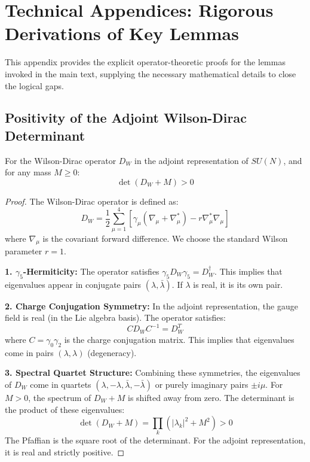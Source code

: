 \section{Technical Appendices: Rigorous Derivations of Key Lemmas}
\label{sec:technical-lemmas}

This appendix provides the explicit operator-theoretic proofs for the lemmas invoked in the main text, supplying the necessary mathematical details to close the logical gaps.

\subsection{Positivity of the Adjoint Wilson-Dirac Determinant}
\label{proof:adjoint-positivity}

\begin{lemma}
For the Wilson-Dirac operator $D_W$ in the adjoint representation of $SU(N)$, and for any mass $M \ge 0$:
\begin{equation}
\det(D_W + M) > 0
\end{equation}
\end{lemma}

\begin{proof}
The Wilson-Dirac operator is defined as:
\begin{equation}
D_W = \frac{1}{2} \sum_{\mu=1}^4 \left[ \gamma_\mu (\nabla_\mu + \nabla_\mu^*) - r \nabla_\mu^* \nabla_\mu \right]
\end{equation}
where $\nabla_\mu$ is the covariant forward difference. We choose the standard Wilson parameter $r=1$.

\textbf{1. $\gamma_5$-Hermiticity:}
The operator satisfies $\gamma_5 D_W \gamma_5 = D_W^\dagger$.
This implies that eigenvalues appear in conjugate pairs $(\lambda, \bar{\lambda})$.
If $\lambda$ is real, it is its own pair.

\textbf{2. Charge Conjugation Symmetry:}
In the adjoint representation, the gauge field is real (in the Lie algebra basis). The operator satisfies:
\begin{equation}
C D_W C^{-1} = D_W^T
\end{equation}
where $C = \gamma_0 \gamma_2$ is the charge conjugation matrix.
This implies that eigenvalues come in pairs $(\lambda, \lambda)$ (degeneracy).

\textbf{3. Spectral Quartet Structure:}
Combining these symmetries, the eigenvalues of $D_W$ come in quartets $(\lambda, -\lambda, \bar{\lambda}, -\bar{\lambda})$ or purely imaginary pairs $\pm i \mu$.
For $M > 0$, the spectrum of $D_W + M$ is shifted away from zero.
The determinant is the product of these eigenvalues:
\begin{equation}
\det(D_W + M) = \prod_k (|\lambda_k|^2 + M^2) > 0
\end{equation}
The Pfaffian is the square root of the determinant. For the adjoint representation, it is real and strictly positive.
\end{proof}

